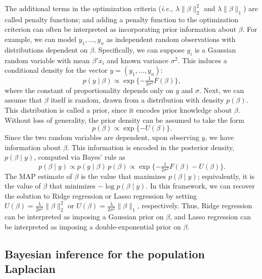 \documentclass[12pt]{article}
\theoremstyle{plain}
\begin{document}
The additional terms in the optimization criteria (\emph{i.e.}, 
$\lambda \|\beta\|_2^2$ and $\lambda \|\beta\|_1$) are called penalty 
functions; and adding a penalty function to the optimization criterion can 
often be interpreted as incorporating prior information about $\beta$.  
For example, we can model $y_1, \dotsc, y_n$ as independent random 
observations with distributions dependent on $\beta$.  
Specifically, we can suppose $y_i$ is a Gaussian random variable with mean 
$\beta' x_i$ and known variance $\sigma^2$.  
This induces a conditional density for the vector $y = (y_1, \dotsc, y_n)$:
\begin{equation}\label{E:regression-density}
  p(y \mid \beta)
    \propto
     \exp\{ -\tfrac{1}{2 \sigma^2} F(\beta) \},
\end{equation}
where the constant of proportionality depends only on $y$ and $\sigma$.
Next, we can assume that $\beta$ itself is random, drawn from a 
distribution with density $p(\beta)$.  
This distribution is called a prior, since it encodes prior knowledge about 
$\beta$.  
Without loss of generality, the prior density can be assumed to take the form
\begin{equation}\label{E:regression-prior}
  p(\beta) \propto \exp\{ -U(\beta) \}.
\end{equation}
Since the two random variables are dependent, upon observing $y$, we have 
information about $\beta$.  
This information is encoded in the posterior density, $p(\beta \mid y)$, 
computed via Bayes' rule as
\begin{equation}\label{E:regression-posterior}
  p(\beta \mid y)
    \propto p(y \mid \beta) \, p(\beta)
    \propto \exp\{ -\tfrac{1}{2 \sigma^2} F(\beta) - U(\beta) \}.
\end{equation}
The MAP estimate of $\beta$ is the value that maximizes $p(\beta \mid y)$;  
equivalently, it is the value of $\beta$ that minimizes 
$-\log p(\beta \mid y)$.  
In this framework, we can recover the solution to Ridge regression or Lasso 
regression by setting
$U(\beta) = \tfrac{\lambda}{2 \sigma^2} \| \beta \|_2^2$ or
$U(\beta) = \tfrac{\lambda}{2 \sigma^2} \| \beta \|_1$, respectively.  
Thus, Ridge regression can be interpreted as imposing a Gaussian prior on 
$\beta$, and Lasso regression can be interpreted as imposing a 
double-exponential prior on $\beta$.


\vspace{-1mm}
\subsection{Bayesian inference for the population Laplacian}
\label{S:bayesian-laplacian}
\end{document}

